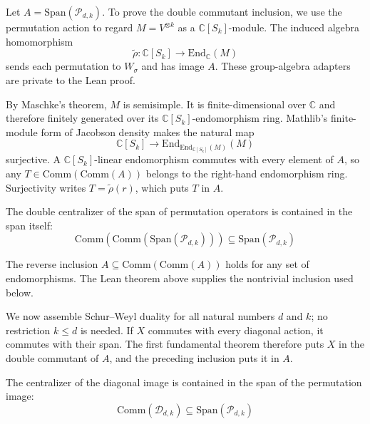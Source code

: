 {\chat
Let $A=\text{Span}(\mathcal{P}_{d,k})$. To prove the double commutant
inclusion, we use the permutation action to regard $M=V^{\otimes k}$ as a
$\mathbb{C}[S_k]$-module. The induced algebra homomorphism
\[
  \widetilde\rho:\mathbb{C}[S_k]\longrightarrow\text{End}_{\mathbb{C}}(M)
\]
sends each permutation to $W_\sigma$ and has image $A$. These group-algebra
adapters are private to the Lean proof.

By Maschke's theorem, $M$ is semisimple. It is finite-dimensional over
$\mathbb{C}$ and therefore finitely generated over its
$\mathbb{C}[S_k]$-endomorphism ring. Mathlib's finite-module form of Jacobson
density makes the natural map
\[
  \mathbb{C}[S_k]\longrightarrow
    \text{End}_{\text{End}_{\mathbb{C}[S_k]}(M)}(M)
\]
surjective. A $\mathbb{C}[S_k]$-linear endomorphism commutes with every
element of $A$, so any $T\in\text{Comm}(\text{Comm}(A))$ belongs to the
right-hand endomorphism ring. Surjectivity writes $T=\widetilde\rho(r)$,
which puts $T$ in $A$.
} %

{\chat
\begin{theorem}\label{thm:double_centralizer_permImage}
  \leanok
  The double centralizer of the span of permutation operators is contained in the span itself:
  \begin{equation}
    \text{Comm}(\text{Comm}(\text{Span}(\mathcal{P}_{d,k}))) \subseteq \text{Span}(\mathcal{P}_{d,k})
  \end{equation}
\end{theorem}
} %

{\chat
The reverse inclusion $A\subseteq\text{Comm}(\text{Comm}(A))$ holds for
any set of endomorphisms. The Lean theorem above supplies the nontrivial
inclusion used below.

We now assemble Schur--Weyl duality for all natural numbers $d$ and $k$;
no restriction $k\le d$ is needed. If $X$ commutes with every diagonal action,
it commutes with their span. The first fundamental theorem therefore puts
$X$ in the double commutant of $A$, and the preceding inclusion puts it in $A$.
} %

{\chat
\begin{theorem}\label{thm:centralizer_diagImage_le_span_permImage}
  \leanok
  The centralizer of the diagonal image is contained in the span of the permutation image:
  \begin{equation}
    \text{Comm}(\mathcal{D}_{d,k}) \subseteq \text{Span}(\mathcal{P}_{d,k})
  \end{equation}
\end{theorem}
} %

